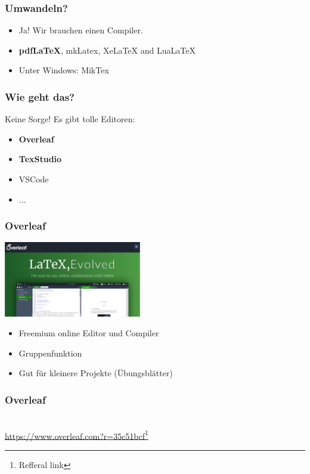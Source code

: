 \documentclass{beamer}
\begin{document}
\begin{frame}
     \frametitle{Umwandeln?}
     \begin{itemize}[<+->]
          \item Ja! Wir brauchen einen Compiler.
               \item \textbf{pdfLaTeX}, mkLatex, XeLaTeX and LuaLaTeX
               \item Unter Windows: MikTex
     \end{itemize}
\end{frame}




\begin{frame}
     \frametitle{Wie geht das?}
     Keine Sorge! Es gibt tolle Editoren:
     \begin{itemize}[<+->]
          \item \textbf{Overleaf}
          \item \textbf{TexStudio}
          \item VSCode
          \item ...
     \end{itemize}
\end{frame}

\begin{frame}
	\frametitle{Overleaf}
	\includegraphics[width=6cm]{pictures/overleaf.png}
	\begin{itemize}[<+->]
		\item Freemium online Editor und Compiler
		\item Gruppenfunktion
		\item Gut für kleinere Projekte (Übungsblätter)
	\end{itemize}
\end{frame}


\begin{frame}
	\frametitle{Overleaf}
	\centering
	\\
	\url{https://www.overleaf.com?r=35c51bcf}\footnote{Refferal link}
\end{frame}
\end{document}
